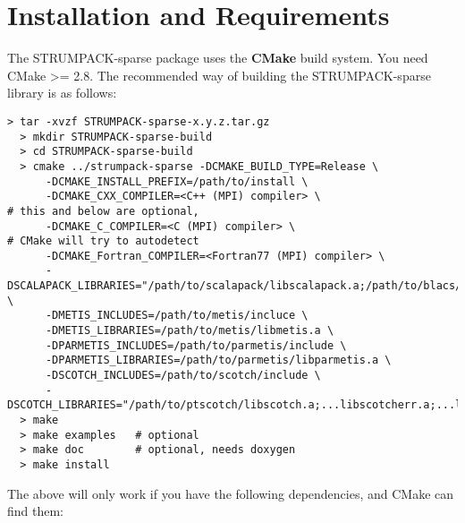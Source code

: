 \documentclass{article}
\begin{document}
\section{Installation and Requirements}\label{sec::installation}
The STRUMPACK-sparse package uses the \textbf{CMake} build system. You
need CMake >= 2.8. The recommended way of building the
STRUMPACK-sparse library is as follows:
\begin{lstlisting}[style=Bash]
  > tar -xvzf STRUMPACK-sparse-x.y.z.tar.gz
  > mkdir STRUMPACK-sparse-build
  > cd STRUMPACK-sparse-build
  > cmake ../strumpack-sparse -DCMAKE_BUILD_TYPE=Release \
      -DCMAKE_INSTALL_PREFIX=/path/to/install \
      -DCMAKE_CXX_COMPILER=<C++ (MPI) compiler> \                             # this and below are optional,
      -DCMAKE_C_COMPILER=<C (MPI) compiler> \                                 # CMake will try to autodetect
      -DCMAKE_Fortran_COMPILER=<Fortran77 (MPI) compiler> \
      -DSCALAPACK_LIBRARIES="/path/to/scalapack/libscalapack.a;/path/to/blacs/libblacs.a" \
      -DMETIS_INCLUDES=/path/to/metis/incluce \
      -DMETIS_LIBRARIES=/path/to/metis/libmetis.a \
      -DPARMETIS_INCLUDES=/path/to/parmetis/include \
      -DPARMETIS_LIBRARIES=/path/to/parmetis/libparmetis.a \
      -DSCOTCH_INCLUDES=/path/to/scotch/include \
      -DSCOTCH_LIBRARIES="/path/to/ptscotch/libscotch.a;...libscotcherr.a;...libptscotch.a;...libptscotcherr.a"
  > make
  > make examples   # optional
  > make doc        # optional, needs doxygen
  > make install
\end{lstlisting}
The above will only work if you have the following dependencies, and
CMake can find them:
\end{document}
